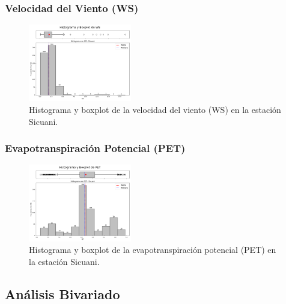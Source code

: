 \subsubsection*{Velocidad del Viento (WS)}
\begin{figure}[H]
\centering
\includegraphics[width=0.4\textwidth]{resultados/por_estacion_meteorologica/Sicuani/WS_histograma.png}
\caption{Histograma y boxplot de la velocidad del viento (WS) en la estación Sicuani.}
\label{fig:sicuani_WS}
\end{figure}

\subsubsection*{Evapotranspiración Potencial (PET)}
\begin{figure}[H]
\centering
\includegraphics[width=0.4\textwidth]{resultados/por_estacion_meteorologica/Sicuani/PET_histograma.png}
\caption{Histograma y boxplot de la evapotranspiración potencial (PET) en la estación Sicuani.}
\label{fig:sicuani_PET}
\end{figure}

\subsection{Análisis Bivariado}

